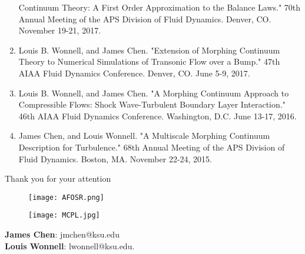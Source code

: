 \documentclass{beamer}
\begin{document}
\begin{frame}
\begin{enumerate}
Continuum Theory: A First Order Approximation to the Balance Laws." 70th Annual 
Meeting of the APS Division of Fluid Dynamics. Denver, CO. November 19-21, 2017.
\item Louis B. Wonnell, and James Chen. "Extension of Morphing Continuum Theory 
to Numerical Simulations of Transonic Flow over a Bump." 47th AIAA Fluid 
Dynamics Conference. Denver, CO. June 5-9, 2017.
\item Louis B. Wonnell, and James Chen. "A Morphing Continuum Approach to 
Compressible Flows: Shock Wave-Turbulent Boundary Layer Interaction." 46th AIAA 
Fluid Dynamics Conference. Washington, D.C. June 13-17, 2016.
\item James Chen, and Louis Wonnell. "A Multiscale Morphing Continuum 
Description for Turbulence." 68th Annual Meeting of the APS Division of Fluid 
Dynamics. Boston, MA. November 22-24, 2015.
\end{enumerate}


\end{frame}


\begin{frame}
\Huge{\centerline{Thank you for your attention}}
\centering
\begin{multicols}{2}
\begin{figure}
 \texttt{[image: AFOSR.png]}
\end{figure}

\begin{figure}
 \texttt{[image: MCPL.jpg]}
\end{figure}
\end{multicols}
\large
\centering
\textbf{James Chen}: jmchen@ksu.edu\\
\textbf{Louis Wonnell}: lwonnell@ksu.edu.
\end{frame}

\end{document}
